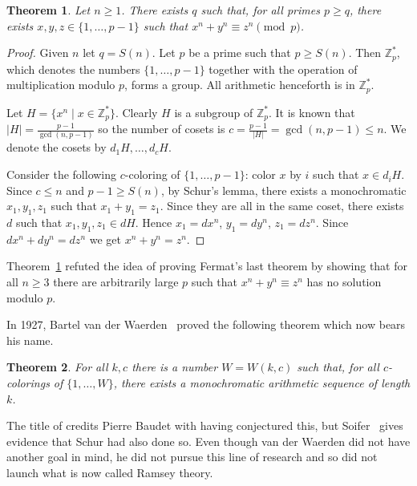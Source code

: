 \documentclass{article}
\theoremstyle{plain}
\newtheorem{thm}{Theorem}
\theoremstyle{definition}
\newcommand{\Zed}{\mathbb{Z}}   %
\begin{document}
\begin{thm} 
\label{schurfermat}
Let $n\ge 1$. 
There exists $q$ such that, for all primes $p\ge q$,
there exists $x,y,z\in \{1,\ldots,p-1\}$ such that 
$x^n+y^n\equiv z^n \pmod p$.
\end{thm}

\begin{proof}
Given $n$ let $q=S(n)$.
Let $p$ be a prime such that $p\ge S(n)$.
Then $\Zed_p^*$, which denotes the numbers
$\{1,\ldots,p-1\}$ together with the operation of 
 multiplication modulo $p$, forms a group.
All arithmetic henceforth is in $\Zed_p^*$.

Let $H = \{ x^n  \mid x\in \Zed_p^* \}$. Clearly $H$ is a subgroup of $\Zed_p^*$.
It is known that $|H|=\frac{p-1}{\gcd(n,p-1)}$ so the number of cosets is 
$c=\frac{p-1}{|H|} = \gcd(n,p-1) \le n$.
We denote the cosets by
$d_1H,\ldots,d_cH$. 

Consider the following $c$-coloring of $\{1,\ldots,p-1\}$:
color $x$ by $i$ such that $x\in d_iH$.
Since $c\le n$ and $p-1\ge S(n)$, by Schur's lemma,
there exists a monochromatic $x_1,y_1,z_1$ such that $x_1+y_1=z_1$.
Since they are all in the same coset, there exists $d$ such that
$x_1,y_1,z_1 \in dH$. Hence 
$x_1=dx^n$, 
$y_1=dy^n$, 
$z_1=dz^n$.
Since $dx^n + dy^n = dz^n$ we get $x^n+y^n=z^n$.
\end{proof}


Theorem~\ref{schurfermat} refuted the idea of proving
Fermat's last theorem by showing that for all $n\ge 3$ there are arbitrarily large $p$ such that $x^n+y^n\equiv z^n$
has no solution modulo $p$.

In 1927, Bartel van der Waerden~\cite{VDW} 
proved the following theorem which now bears his name.

\begin{thm} 
\label{vdw}
For all $k,c$ there is a number $W=W(k,c)$
such that, for all $c$-colorings of $\{1,\ldots,W\}$,
there exists a monochromatic arithmetic sequence of length $k$.
\end{thm}

The title of \cite{VDW} credits Pierre Baudet with having conjectured this, but
Soifer~\cite{coloring} gives evidence that Schur had also done so.
Even though van der Waerden did not have another goal in mind, he did not pursue
this line of research and 
so did not launch what is now called Ramsey theory.
\end{document}
